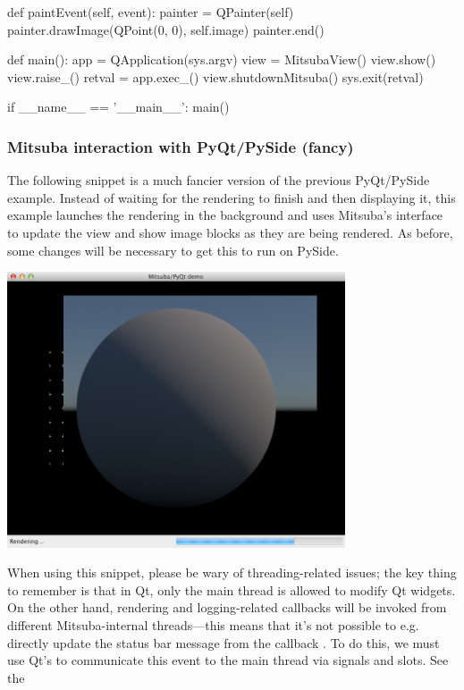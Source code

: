 \begin{python}
    def paintEvent(self, event):
        painter = QPainter(self)
        painter.drawImage(QPoint(0, 0), self.image)
        painter.end()

def main():
    app = QApplication(sys.argv)
    view = MitsubaView()
    view.show()
    view.raise_()
    retval = app.exec_()
    view.shutdownMitsuba()
    sys.exit(retval)

if __name__ == '__main__':
    main()
\end{python}

\subsubsection{Mitsuba interaction with PyQt/PySide (fancy)}
The following snippet is a much fancier version of the previous PyQt/PySide example.
Instead of waiting for the rendering to finish and then displaying it, this example launches the
rendering in the background and uses Mitsuba's  interface to update the
view and show image blocks as they are being rendered.
As before, some changes will be necessary to get this to run on PySide.
\begin{center}
    \includegraphics[width=10cm]{images/python_demo.jpg}
\end{center}
When using this snippet, please be wary of threading-related issues; the key thing to remember is that
in Qt, only the main thread is allowed to modify Qt widgets. On the other hand, rendering and logging-related
callbacks will be invoked from different Mitsuba-internal threads---this means that it's not possible to e.g.
directly update the status bar message from the callback . To do this, we must
use Qt's  to communicate this event to the main thread via signals and slots. See the
